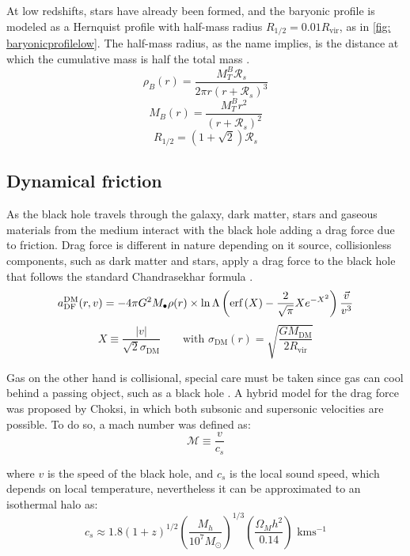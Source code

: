 		At low redshifts, stars have already been formed, and the baryonic profile is modeled as a Hernquist profile with half-mass radius $R_{1/2} = 0.01 R_\text{vir}$, as in \autoref{fig: baryonicprofilelow}. The half-mass radius, as the name implies, is the distance at which the cumulative mass is half the total mass \cite{hernquist1990analytical}.
		\begin{equation}
			\rho_B(r) = \dfrac{M_T^B \mathcal{R}_s}{2\pi r(r + \mathcal{R}_s)^3}
		\end{equation}
		\begin{equation}
			M_B(r) = \dfrac{M_T^B r^2}{(r + \mathcal{R}_s)^2}
		\end{equation}
		\begin{equation}
			R_{1/2} = \left(1 + \sqrt{2}\right)\mathcal{R}_s
		\end{equation}
		
	\subsection{Dynamical friction}
		As the black hole travels through the galaxy, dark matter, stars and gaseous materials from the medium interact with the black hole adding a drag force due to friction. Drag force is different in nature depending on it source, collisionless components, such as dark matter and stars, apply a drag force to the black hole that follows the standard Chandrasekhar formula \cite{choksi2017recoiling}.
		\begin{equation}
			a_\text{DF}^\text{DM}(r, v) = -4\pi G^2 M_\bullet\rho(r) \times \ln \Lambda\left(\text{erf}\left(X\right) - \dfrac{2}{\sqrt{\pi}}Xe^{-X^2}\right)\dfrac{\vec{v}}{v^3}
		\end{equation}
		\begin{equation}
			X \equiv \dfrac{|v|}{\sqrt{2}\sigma_\text{DM}} \qquad \text{with } \sigma_\text{DM}(r) = \sqrt{\dfrac{GM_\text{DM}}{2R_\text{vir}}}
		\end{equation}
		
		 Gas on the other hand is collisional, special care must be taken since gas can cool behind a passing object, such as a black hole \cite{choksi2017recoiling}. A hybrid model for the drag force was proposed by Choksi, in which both subsonic and supersonic velocities are possible. To do so, a mach number was defined as:
		 \begin{equation}
			 \mathcal{M} \equiv \dfrac{v}{c_s}
		 \end{equation}
		 
		 where $v$ is the speed of the black hole, and $c_s$ is the local sound speed, which depends on local temperature, nevertheless it can be approximated to an isothermal halo as:
		 \begin{equation}
		 	c_s \approx 1.8(1 + z)^{1/2}\left(\dfrac{M_h}{10^7M_\odot}\right)^{1/3}\left(\dfrac{\Omega_M h^2}{0.14}\right)\text{ kms$^{-1}$}
		 \end{equation}
		 
